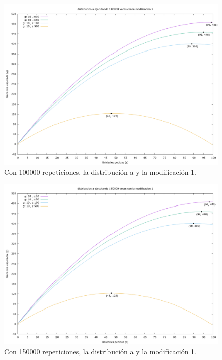 \documentclass[12pt, spanish]{article}
\begin{document}
\begin{figure}[H]
	\centering
	\includegraphics[scale = 0.3]{prob_a/datos_a_100000_1.png}
	\caption{Con 100000 repeticiones, la distribución a y la modificación 1.}
	\label{fig:ej1_a_100000}

\end{figure}

\begin{figure}[H]
	\centering
	\includegraphics[scale = 0.3]{prob_a/datos_a_150000_1.png}
	\caption{Con 150000 repeticiones, la distribución a y la modificación 1.}
	\label{fig:ej1_a_150000}

\end{figure}
\end{document}
